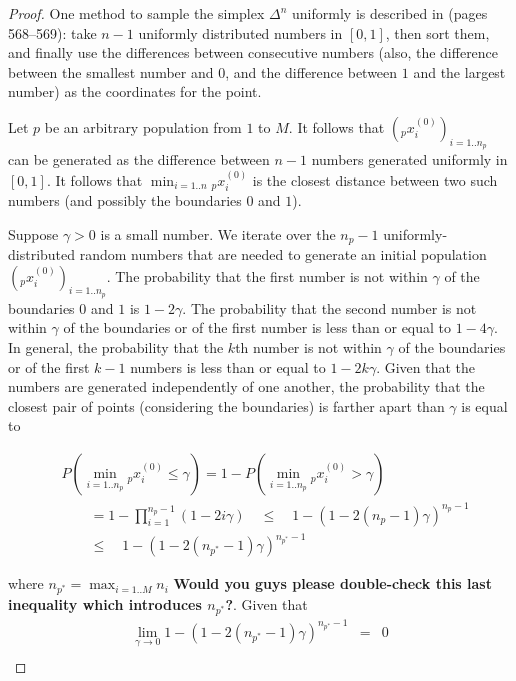 \documentclass{acm_proc_article-sp}
\begin{document}
\begin{proof}

One method to sample the simplex $\Delta^n$ uniformly is described in \cite{devroye86nonuniform} (pages 568--569): take $n-1$ uniformly distributed numbers in $\left[0,1\right]$, then sort them, and finally use the differences between consecutive numbers (also, the difference between the smallest number and $0$, and the difference between $1$ and the largest number) as the coordinates for the point.  

Let $p$ be an arbitrary population from $1$ to $M$.  It follows that $\left({_p}x^{(0)}_i\right)_{i=1..n_p}$ can be generated as the difference between $n-1$ numbers generated uniformly in $\left[0,1\right]$.  It follows that $\min_{i=1..n} {_p}x^{(0)}_i$ is the closest distance between two such numbers (and possibly the boundaries $0$ and $1$).

Suppose $\gamma>0$ is a small number.  We iterate over the $n_p - 1$ uniformly-distributed random numbers that are needed to generate an initial population $\left({_p}x^{(0)}_i\right)_{i=1..n_p}$.  The probability that the first number is not within $\gamma$ of the boundaries $0$ and $1$ is $1-2\gamma$.  The probability that the second number is not within $\gamma$ of the boundaries or of the first number is less than or equal to $1-4\gamma$.  In general, the probability that the $k$th number is not within $\gamma$ of the boundaries or of the first $k-1$ numbers is less than or equal to $1-2 k \gamma$.  Given that the numbers are generated independently of one another, the probability that the closest pair of points (considering the boundaries) is farther apart than $\gamma$ is equal to

\begin{eqnarray*}
&P\left( \min_{i=1..n_p} {_p}x^{(0)}_i \leq \gamma \right) = 1 - P\left( \min_{i=1..n_p} {_p}x^{(0)}_i > \gamma \right)\\
&\quad \quad = 1 - \prod^{n_p - 1}_{i=1} \left( 1-2 i \gamma \right) \quad \leq \quad 1 - \left( 1 - 2 \left(n_p - 1\right) \gamma \right)^{n_p - 1}\\
&\quad \quad \leq \quad 1 - \left( 1 - 2 \left(n_{p^*} - 1\right) \gamma \right)^{n_{p^*} - 1}
\end{eqnarray*}

\noindent where $n_{p^*} = \max_{i=1..M} n_i$ \textbf{Would you guys please double-check this last inequality which introduces $n_{p^*}$?}.  Given that
\begin{eqnarray*}
\lim_{\gamma \rightarrow 0} 1 - \left( 1 - 2 \left(n_{p^*} - 1\right) \gamma \right)^{n_{p^*} - 1} & = & 0\\
\end{eqnarray*}


\end{proof}
\end{document}
